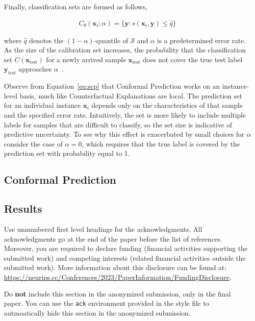 \documentclass{article}
\begin{document}
Finally, classification sets are formed as follows,

\begin{equation}\label{eq:scp}
  \begin{aligned}
    C_{\theta}(\mathbf{x}_i;\alpha)=\{\mathbf{y}: s(\mathbf{x}_i,\mathbf{y}) \le \hat{q}\}
  \end{aligned}
\end{equation}

where $\hat{q}$ denotes the $(1-\alpha)$-quantile of $\mathcal{S}$ and $\alpha$ is a predetermined error rate. As the size of the calibration set increases, the probability that the classification set $C(\mathbf{x}_{\text{test}})$ for a newly arrived sample $\mathbf{x}_{\text{test}}$ does not cover the true test label $\mathbf{y}_{\text{test}}$ approaches $\alpha$~\citep{angelopoulos2021gentle}. 

Observe from Equation~\ref{eq:scp} that Conformal Prediction works on an instance-level basis, much like Counterfactual Explanations are local. The prediction set for an individual instance $\mathbf{x}_i$ depends only on the characteristics of that sample and the specified error rate. Intuitively, the set is more likely to include multiple labels for samples that are difficult to classify, so the set size is indicative of predictive uncertainty. To see why this effect is exacerbated by small choices for $\alpha$ consider the case of $\alpha=0$, which requires that the true label is covered by the prediction set with probability equal to 1.

\subsection{Conformal Prediction}\label{app:eccco}

\subsection{Results}\label{app:results}




\begin{ack}
Use unnumbered first level headings for the acknowledgments. All acknowledgments
go at the end of the paper before the list of references. Moreover, you are required to declare
funding (financial activities supporting the submitted work) and competing interests (related financial activities outside the submitted work).
More information about this disclosure can be found at: \url{https://neurips.cc/Conferences/2023/PaperInformation/FundingDisclosure}.


Do {\bf not} include this section in the anonymized submission, only in the final paper. You can use the \texttt{ack} environment provided in the style file to autmoatically hide this section in the anonymized submission.
\end{ack}
\end{document}
